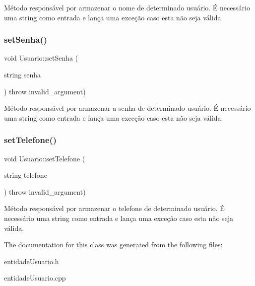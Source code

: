 Método responsável por armazenar o nome de determinado usuário. É necessário uma string como entrada e lança uma exceção caso esta não seja válida. \mbox{\label{classUsuario_ad6ca0fc126212f12a73e7e8536646d60}} 
\subsubsection{\texorpdfstring{set\+Senha()}{setSenha()}}
{\footnotesize\ttfamily void Usuario\+::set\+Senha (\begin{DoxyParamCaption}\item[{string}]{senha }\end{DoxyParamCaption}) throw  invalid\+\_\+argument) \hspace{0.3cm}{\ttfamily [inline]}}

Método responsável por armazenar a senha de determinado usuário. É necessário uma string como entrada e lança uma exceção caso esta não seja válida. \mbox{\label{classUsuario_a8414f48478d2edf70a4ab274136a3bdf}} 
\subsubsection{\texorpdfstring{set\+Telefone()}{setTelefone()}}
{\footnotesize\ttfamily void Usuario\+::set\+Telefone (\begin{DoxyParamCaption}\item[{string}]{telefone }\end{DoxyParamCaption}) throw  invalid\+\_\+argument) \hspace{0.3cm}{\ttfamily [inline]}}

Método responsável por armazenar o telefone de determinado usuário. É necessário uma string como entrada e lança uma exceção caso esta não seja válida. 

The documentation for this class was generated from the following files\+:\begin{DoxyCompactItemize}
\item 
entidade\+Usuario.\+h\item 
entidade\+Usuario.\+cpp\end{DoxyCompactItemize}
